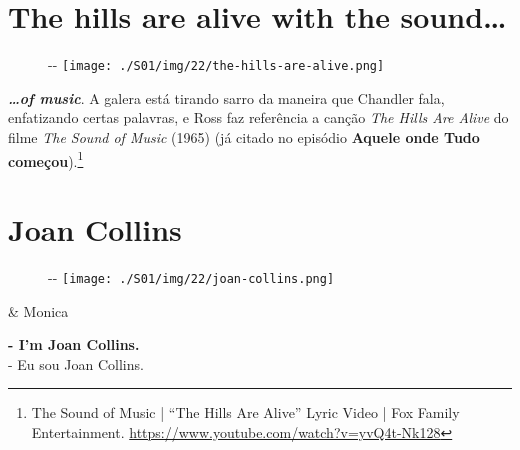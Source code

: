 \hypertarget{the-hills-are-alive-with-the-sound}{%
\section{The hills are alive with the
sound\ldots{}}\label{the-hills-are-alive-with-the-sound}}

\begin{figure}[!ht]
  \begin{adjustwidth}{-\oddsidemargin-1in}{-\rightmargin}
    \centering
    \texttt{[image: ./S01/img/22/the-hills-are-alive.png]}
  \end{adjustwidth}
\end{figure}

\textbf{\emph{\ldots of music}}. A galera está tirando sarro da maneira
que Chandler fala, enfatizando certas palavras, e Ross faz referência a
canção \emph{The Hills Are Alive} do filme \emph{The Sound of Music}
(1965) (já citado no episódio
\textbf{\textcolor{primarycolor}{Aquele onde Tudo começou}}).\footnote{\sloppy The Sound of Music | ``The Hills Are Alive'' Lyric Video | Fox Family Entertainment. \url{https://www.youtube.com/watch?v=yvQ4t-Nk128}}

\hypertarget{joan-collins}{%
\section{Joan Collins}\label{joan-collins}}

\begin{figure}[!ht]
  \begin{adjustwidth}{-\oddsidemargin-1in}{-\rightmargin}
    \centering
    \texttt{[image: ./S01/img/22/joan-collins.png]}
  \end{adjustwidth}
\end{figure}

\begin{tcolorbox}[enhanced,center upper,
    drop fuzzy shadow southeast, boxrule=0.3pt,
    lower separated=false, breakable,
    colframe=black!30!dialogoBorder,colback=white]
\begin{minipage}[c]{0.16\linewidth}
   & \centering \scriptsize{Monica}
\end{minipage}
\hfill
\begin{minipage}[c]{0.8\linewidth}
  \textbf{- I'm Joan Collins.}\\
  - Eu sou Joan Collins.
\end{minipage}
\end{tcolorbox}

